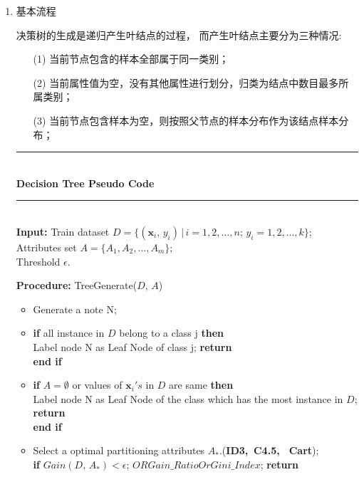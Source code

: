 \documentclass[a4paper]{article}
\begin{document}
	\begin{enumerate}
		\item 基本流程 \par
			决策树的生成是递归产生叶结点的过程， 而产生叶结点主要分为三种情况:
				\begin{itemize}
					\item[(1)] 当前节点包含的样本全部属于同一类别；
					\item[(2)] 当前属性值为空，没有其他属性进行划分，归类为结点中数目最多所属类别；
					\item[(3)] 当前节点包含样本为空，则按照父节点的样本分布作为该结点样本分布；
				\end{itemize}
			\noindent\rule[0.1\baselineskip]{\textwidth}{0.75pt}\\
			\textbf{Decision Tree Pseudo Code}\\
			\noindent\rule[0.1\baselineskip]{\textwidth}{0.5pt}\\
			\textbf{Input:} Train dataset $D = \{(\textbf{x}_i,\,y_i)\,|\,i = 1, 2,\dots, n;\, y_i = 1, 2, ..., k\}$;\\
			\hspace*{32pt} Attributes set $A = \{A_1,A_2,\dots, A_m\}$;\\
			\hspace*{32pt} Threshold $\epsilon$. \par
			\textbf{Procedure:} TreeGenerate($D,\,A$)
				\begin{itemize}
					\item Generate a note N;
					\item \textbf{if} all instance in $D$ belong to a class j \textbf{then}\\
							\hspace*{12pt} Label node N as Leaf Node of class j; \textbf{return}\\
						\textbf{end if}
					\item \textbf{if} $A = \emptyset$ or values of $\textbf{x}_{i}'s$ in $D$ are same \textbf{then}\\
							\hspace*{12pt} Label node N as Leaf Node of the class which has the most instance in $D$; \textbf{return} \\ \textbf{end if}
					\item Select a optimal partitioning attributes $A_*$.(\textbf{ID3,\, C4.5, \, Cart});\\
					\textbf{if} $Gain(D,\,A_*) < \epsilon$; \(OR Gain\_Ratio Or Gini\_Index\); \textbf{return}\\

\end{itemize}
\end{enumerate}
\end{document}
